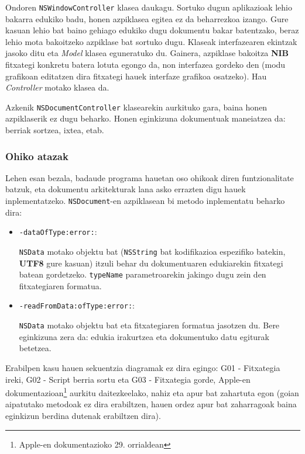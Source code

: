 Ondoren \texttt{NSWindowController} klasea daukagu. Sortuko dugun aplikazioak lehio bakarra edukiko badu, honen azpiklasea egitea ez da beharrezkoa izango. Gure kasuan lehio bat baino gehiago edukiko dugu dokumentu bakar batentzako, beraz lehio mota bakoitzeko azpiklase bat sortuko dugu. Klaseak interfazearen ekintzak jasoko ditu eta \textit{Model} klasea eguneratuko du. Gainera, azpiklase bakoitza \textbf{NIB} fitxategi konkretu batera lotuta egongo da, non interfazea gordeko den (modu grafikoan editatzen dira fitxategi hauek interfaze grafikoa osatzeko). Hau \textit{Controller} motako klasea da.

Azkenik \texttt{NSDocumentController} klasearekin aurkituko gara, baina honen azpiklaserik ez dugu beharko. Honen eginkizuna dokumentuak maneiatzea da: berriak sortzea, ixtea, etab.

\subsubsection{Ohiko atazak}
Lehen esan bezala, badaude programa hauetan oso ohikoak diren funtzionalitate batzuk, eta dokumentu arkitekturak lana asko errazten digu hauek inplementatzeko. \texttt{NSDocument}-en azpiklasean bi metodo inplementatu beharko dira:
\begin{itemize}
\item \texttt{-dataOfType:error:}:

\texttt{NSData} motako objektu bat (\texttt{NSString} bat kodifikazioa espezifiko batekin, \textbf{UTF8} gure kasuan) itzuli behar du dokumentuaren edukiarekin fitxategi batean gordetzeko. \texttt{typeName} parametroarekin jakingo dugu zein den fitxategiaren formatua.

\item \texttt{-readFromData:ofType:error:}:

\texttt{NSData} motako objektu bat eta fitxategiaren formatua jasotzen du. Bere eginkizuna zera da: edukia irakurtzea eta dokumentuko datu egiturak betetzea.
\end{itemize}

Erabilpen kasu hauen sekuentzia diagramak ez dira egingo: G01 - Fitxategia ireki, G02 - Script berria sortu eta G03 - Fitxategia gorde, Apple-en dokumentazioan\footnote{Apple-en dokumentazioko\cite{ap:dba} 29. orrialdean} aurkitu daitezkeelako, nahiz eta apur bat zahartuta egon (goian aipatutako metodoak ez dira erabiltzen, hauen ordez apur bat zaharragoak baina eginkizun berdina dutenak erabiltzen dira).

